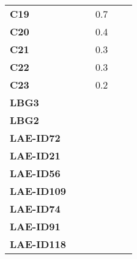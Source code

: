 \begin{tabular}{lrrrrl}
\textbf{C19      } &           &              &      0.7 &             &        \\
\textbf{C20      } &           &              &      0.4 &             &        \\
\textbf{C21      } &           &              &      0.3 &             &        \\
\textbf{C22      } &           &              &      0.3 &             &        \\
\textbf{C23      } &           &              &      0.2 &             &        \\
\textbf{LBG3     } &           &              &          &             &        \\
\textbf{LBG2     } &           &              &          &             &        \\
\textbf{LAE-ID72 } &           &              &          &             &        \\
\textbf{LAE-ID21 } &           &              &          &             &        \\
\textbf{LAE-ID56 } &           &              &          &             &        \\
\textbf{LAE-ID109} &           &              &          &             &        \\
\textbf{LAE-ID74 } &           &              &          &             &        \\
\textbf{LAE-ID91 } &           &              &          &             &        \\
\textbf{LAE-ID118} &           &              &          &             &        \\
\bottomrule
\end{tabular}
